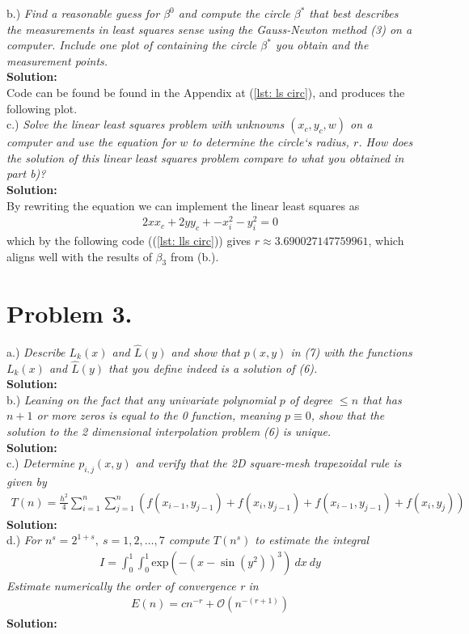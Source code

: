 \documentclass[12pt,
               a4paper,
               article,
               oneside,
               english,oldfontcommands]{memoir}
\let\oldref\ref
\renewcommand{\ref}[1]{(\oldref{#1})}
\newcommand{\spaze}{\vspace{4mm}\\}
\begin{document}
b.) \emph{Find a reasonable guess for $\beta^{0}$ and compute the circle $\beta^{*}$ that best describes the measurements in least squares sense using the Gauss-Newton method (3) on a computer. Include one plot of containing the circle $\beta^{*}$ you obtain and the measurement points.} \spaze 
\textbf{Solution:} \spaze
Code can be found be found in the Appendix at \ref{lst: ls circ}, and produces the following plot. \spaze
c.) \emph{Solve the linear least squares problem with unknowns $(x_c, y_c, w)$ on a computer and use the equation for $w$ to determine the circle`s radius, $r$. How does the solution of this linear least squares problem compare to what you obtained in part b)?}\spaze 
\textbf{Solution:}\spaze 
By rewriting the equation we can implement the linear least squares as 
\begin{align*}
2xx_c + 2yy_c + -x_{i}^2 - y_{i}^2 = 0
\end{align*}
which by the following code (\ref{lst: lls circ}) gives $r \approx 3.690027147759961$, which aligns well with the results of $\beta_3$ from (b.).
\section*{\centering Problem 3.}
a.) \emph{Describe $L_{k}(x)$ and $\hat{L}(y)$ and show that $p(x,y)$ in (7) with the functions $L_{k}(x)$ and $\hat{L}(y)$ that you define indeed is a solution of (6).} \spaze
\textbf{Solution:} \spaze 
b.) \emph{Leaning on the fact that any univariate polynomial $p$ of degree $ \leq n$ that has $n + 1$ or more zeros is equal to the 0 function, meaning $ p \equiv 0$, show that the solution to the 2 dimensional interpolation problem (6) is unique.}\spaze 
\textbf{Solution:} \spaze
c.) \emph{Determine $p_{i,j}(x,y)$ and verify that the 2D square-mesh trapezoidal rule is given by}
\begin{align*}
T(n) = \frac{h^2}{4}\sum_{i=1}^{n}\sum_{j=1}^{n} \left( f(x_{i-1}, y_{j-1}) + f(x_i, y_{j-1}) +  f(x_{i-1}, y_{j-1}) +  f(x_i, y_{j}) \right)
\end{align*}
\textbf{Solution:} \spaze
d.) \emph{ For $n^s = 2^{1+s}, \ s = 1,2, \ldots, 7$ compute $T(n^s)$ to estimate the integral}
\begin{align*}
I = \int_{0}^{1} \int_{0}^{1} \text{exp}(-(x - \sin(y^2))^3) \ dx \ dy
\end{align*}
\emph{Estimate numerically the order of convergence r in}
\begin{align*}
E(n) = cn^{-r} + \mathcal{O}(n^{-(r+1)})
\end{align*}
\textbf{Solution:} \spaze
\end{document}
